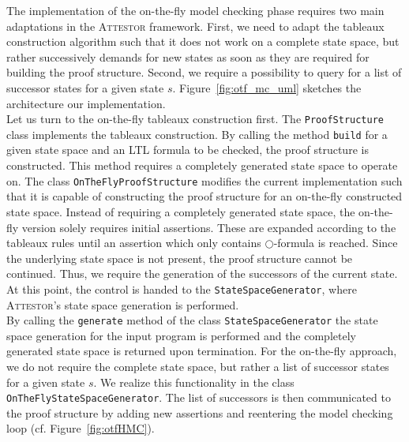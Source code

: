 \documentclass[a4paper, 12pt, twoside]{report}
\begin{document}
	The implementation of the on-the-fly model checking phase requires two main adaptations in the \textsc{Attestor} framework. First, we need to adapt the tableaux construction algorithm such that it does not work on a complete state space, but rather successively demands for new states as soon as they are required for building the proof structure. Second, we require a possibility to query for a list of successor states for a given state $s$. Figure~\ref{fig:otf_mc_uml} sketches the architecture our implementation.\\
	
	Let us turn to the on-the-fly tableaux construction first. The \texttt{ProofStructure} class implements the tableaux construction. By calling the method \texttt{build} for a given state space and an LTL formula to be checked, the proof structure is constructed. This method requires a completely generated state space to operate on. The class \texttt{OnTheFlyProofStructure} modifies the current implementation such that it is capable of constructing the proof structure for an on-the-fly constructed state space. Instead of requiring a completely generated state space, the on-the-fly version solely requires initial assertions. These are expanded according to the tableaux rules until an assertion which only contains $\bigcirc$-formula is reached. Since the underlying state space is not present, the proof structure cannot be continued. Thus, we require the generation of the successors of the current state. At this point, the control is handed to the \texttt{StateSpaceGenerator}, where \textsc{Attestor}'s state space generation is performed.\\
	
	By calling the \texttt{generate} method of the class \texttt{StateSpaceGenerator} the state space generation for the input program is performed and the completely generated state space is returned upon termination. For the on-the-fly approach, we do not require the complete state space, but rather a list of successor states for a given state $s$. We realize this functionality in the class \texttt{OnTheFlyStateSpaceGenerator}. The list of successors is then communicated to the proof structure by adding new assertions and reentering the model checking loop (cf. Figure~\ref{fig:otfHMC}).\\
	
\end{document}
